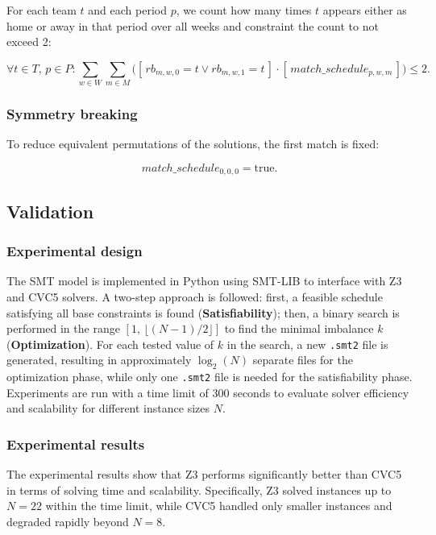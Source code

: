 For each team $t$ and each period $p$, we count how many times $t$ appears either as home or away in that period over all weeks and constraint the count to not exceed 2:

\[
\forall t \in T,\, p \in P: 
\sum_{w \in W} \sum_{m \in M} 
\big(
[\,rb_{m,w,0} = t \lor rb_{m,w,1} = t\,] \cdot [\,match\_schedule_{p,w,m}\,]
\big) \leq 2.
\]

\subsubsection{Symmetry breaking}

To reduce equivalent permutations of the solutions, the first match is fixed:

\[
match\_schedule_{0,0,0} = \text{true}.
\]

\subsection{Validation}

\subsubsection{Experimental design}

The SMT model is implemented in Python using SMT-LIB to interface with Z3 and CVC5 solvers. A two-step approach is followed: first, a feasible schedule satisfying all base constraints is found (\textbf{Satisfiability}); then, a binary search is performed in the range $[1,\, \lfloor(N-1)/2\rfloor]$ to find the minimal imbalance $k$ (\textbf{Optimization}). For each tested value of $k$ in the search, a new \texttt{.smt2} file is generated, resulting in approximately $\log_2(N)$ separate files for the optimization phase, while only one \texttt{.smt2} file is needed for the satisfiability phase. Experiments are run with a time limit of 300 seconds to evaluate solver efficiency and scalability for different instance sizes $N$.


\subsubsection{Experimental results}

The experimental results show that Z3 performs significantly better than CVC5 in terms of solving time and scalability. Specifically, Z3 solved instances up to $N=22$ within the time limit, while CVC5 handled only smaller instances and degraded rapidly beyond $N=8$.

